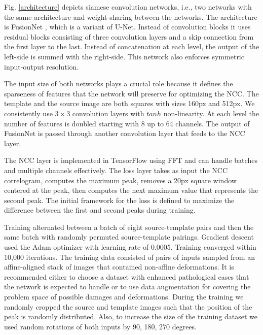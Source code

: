 \documentclass{article}
\begin{document}
 Fig. \ref{architecture} depicts siamese convolution networks, i.e., two networks with the same architecture and weight-sharing between the networks. The architecture is FusionNet \citet{hegde2016fusionnet}, which is a variant of U-Net. Instead of convolution blocks it uses residual blocks consisting of three convolution layers and a skip connection from the first layer to the last. Instead of concatenation at each level, the output of the left-side is summed with the right-side. This network also enforces symmetric input-output resolution.
 
 The input size of both networks plays a crucial role because it defines the sparseness of features that the network will preserve for optimizing the NCC. The template and the source image are both squares with sizes 160px and 512px. We consistently use $3\times 3$ convolution layers with $tanh$ non-linearity. At each level the number of features is doubled starting with 8 up to 64 channels. The output of FusionNet is passed through another convolution layer that feeds to the NCC layer. 

 The NCC layer is implemented in TensorFlow using FFT \citet{lewis1995fast} and can handle batches and multiple channels effectively. The loss layer takes as input the NCC correlogram, computes the maximum peak, removes a 20px square window centered at the peak, then computes the next maximum value that represents the second peak. The initial framework for the loss is defined to maximize the difference between the first and second peaks during training. 
 

 Training alternated between a batch of eight source-template pairs and then the same batch with randomly permuted source-template pairings. Gradient descent used the Adam optimizer with learning rate of 0.0005. Training converged within 10,000 iterations. The training data consisted of pairs of inputs sampled from an affine-aligned stack of images that contained non-affine deformations. It is recommended either to choose a dataset with enhanced pathological cases that the network is expected to handle or to use data augmentation for covering the problem space of possible damages and deformations. During the training we randomly cropped the source and template images such that the position of the peak is randomly distributed. Also, to increase the size of the training dataset we used random rotations of both inputs by 90, 180, 270 degrees. 
 
\end{document}
